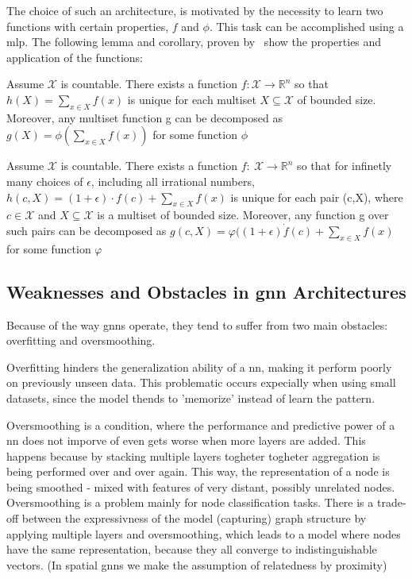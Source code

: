 The choice of such an architecture, is motivated by the necessity to learn two functions with certain properties,
$f$ and $\phi$. This task can be accomplished using a \ac{mlp}.
The following lemma and corollary, proven by~\citet{Xu2019} show the properties and application of the functions:

\begin{lem}
    Assume $\mathcal{X}$ is countable. There exists a function $f:\mathcal{X} \rightarrow \mathbb{R}^n$
    so that $h(X) = \sum_{x \in X}f(x)$ is unique for each multiset $X \subseteq \mathcal{X}$ of
    bounded size. Moreover, any multiset function g can be decomposed as $g(X) = \phi(\sum_{x \in X}f(x))$
    for some function $\phi$
\end{lem}

\begin{cor}
    Assume $\mathcal{X}$ is countable. There exists a function $f:\ \mathcal{X} \rightarrow \mathbb{R}^n$
    so that for infinetly many choices of $\epsilon$, including all irrational numbers, $h(c,X) = (1+ \epsilon)\cdot f(c) + \sum_{x \in X}f(x)$
    is unique for each pair (c,X), where $c \in \mathcal{X}$ and $X \subseteq \mathcal{X}$ is a multiset of bounded
    size. Moreover, any function g over such pairs can be decomposed as $g(c,X) = \varphi((1+\epsilon)\dot f(c) +\sum_{x \in X}f(x)$
    for some function $\varphi$
\end{cor}




\subsection{Weaknesses and Obstacles in \ac{gnn} Architectures}
\label{sec:related:pred:typical}
Because of the way \acp{gnn} operate, they tend to suffer from two main obstacles:
overfitting and oversmoothing.

Overfitting hinders the generalization ability of a \acf{nn}, making it perform poorly
on previously unseen data. This problematic occurs expecially when using small datasets,
since the model thends to 'memorize' instead of learn the pattern.


Oversmoothing is a condition, where the performance and predictive power of a \ac{nn}
does not imporve of even gets worse when more layers are added. This happens because
by stacking multiple layers  togheter togheter aggregation is being performed over and over again.
This way, the representation of a node is being smoothed - mixed with features of
very distant, possibly unrelated nodes. Oversmoothing is a problem mainly for node classification
tasks. There is a trade-off between the expressivness of the model (capturing) graph structure by
applying multiple layers and oversmoothing, which leads to a model where nodes have the same representation,
because they all converge to indistinguishable vectors.\cite{Zhou2020,Hasanzadeh2020}
(In spatial \acp{gnn} we make the assumption of relatedness by proximity)



